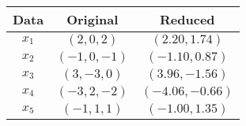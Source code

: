 \documentclass[11pt,a4paper]{report}
\begin{document}
\begin{multicols*}{2}
\begin{center}
\begin{tabular}{| c | c | c |}
\hline
Data  & Original    & Reduced\\ \hline
$x_1$ & $(2,0,2)$   & $(2.20,1.74)$   \\
$x_2$ & $(-1,0,-1)$ & $(-1.10,0.87)$  \\
$x_3$ & $(3,-3,0)$  & $(3.96,-1.56)$  \\
$x_4$ & $(-3,2,-2)$ & $(-4.06,-0.66)$ \\
$x_5$ & $(-1,1,1)$  & $(-1.00,1.35)$  \\ \hline
\end{tabular}
\end{center}

\end{multicols*}
\end{document}
